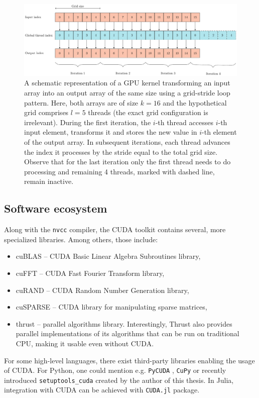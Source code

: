 \begin{example}
\begin{figure}
  \includegraphics[width=\textwidth]{figures/gpu_scheduling}
  \caption{A schematic representation of a GPU kernel transforming an input array into an output array of the same size using a grid-stride loop pattern. Here, both arrays are of size $k=16$ and the hypothetical grid comprises $l=5$ threads (the exact grid configuration is irrelevant). During the first iteration, the $i$-th thread accesses $i$-th input
  element, transforms it and stores the new value in $i$-th element of the output array. In subsequent iterations, each thread advances the index it processes by the stride equal to the total grid size. Observe that for the last iteration only the first thread needs to do processing and remaining 4 threads, marked with dashed line, remain inactive.
  }
  \label{fig:strided-loop}
\end{figure}

\end{example}

\subsection{Software ecosystem}
Along with the \texttt{nvcc} compiler, the CUDA toolkit contains several, more specialized libraries. Among others, those include:
\begin{itemize}
    \item cuBLAS -- CUDA Basic Linear Algebra Subroutines library,
    \item cuFFT -- CUDA Fast Fourier Transform library,
    \item cuRAND -- CUDA Random Number Generation library,
    \item cuSPARSE -- CUDA library for manipulating sparse matrices,
    \item thrust -- parallel algorithms library. Interestingly, Thrust also provides parallel
    implementations of its algorithms that can be run on traditional CPU, making it usable even
    without CUDA.
\end{itemize}

For some high-level languages, there exist third-party libraries enabling the usage of CUDA. For
Python, one could mention e.g. \texttt{PyCUDA} \cite{pycuda}, \texttt{CuPy} \cite{cupy} or recently introduced
\texttt{setuptools\_cuda} \cite{setuptoolscuda} created by the author of this thesis. In Julia, integration with CUDA can be achieved with \texttt{CUDA.jl} \cite{CUDAjl} package.



